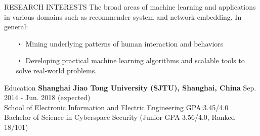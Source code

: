 \documentclass{resume} %
\begin{document}
\vspace{-1em}
\begin{rSection}{RESEARCH INTERESTS}
The broad areas of machine learning and applications in various domains such as recommender system and network embedding. In general:
\begin{itemize}[itemindent=-5mm] 
	\itemsep=-5pt
	\vspace*{-5pt}
	\item[・] Mining underlying patterns of human interaction and behaviors
	\item[・] Developing practical machine learning algorithms and scalable tools to solve real-world problems.
\end{itemize}
\end{rSection}


\begin{rSection}{Education}
\textbf{Shanghai Jiao Tong University (SJTU), Shanghai, China} \hfill Sep. 2014 - Jun. 2018 (expected)\\ %
School of Electronic Information and Electric Engineering  \hfill GPA:3.45/4.0 \\
Bachelor of Science in Cyberspace Security \hfill (Junior GPA 3.56/4.0, Ranked 18/101)
\end{rSection}
\end{document}
